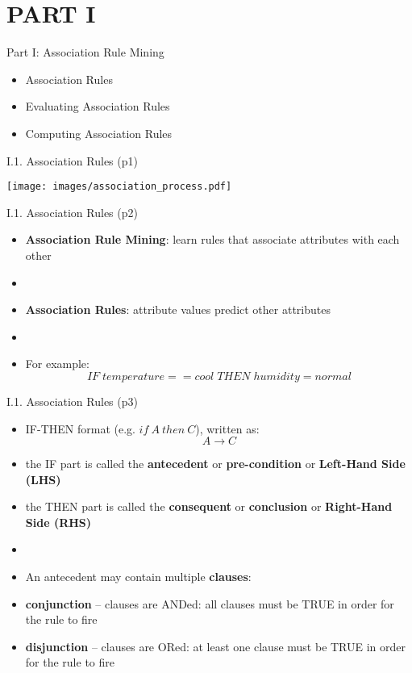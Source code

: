 \documentclass[handout]{beamer}
\newcommand{\strong}[1]{\textbf{\color{teal} #1}}
\newcommand{\stronger}[1]{\textbf{\color{purple} #1}}
\begin{document}
\section{PART I}
\begin{frame}{Part I: Association Rule Mining}
\begin{itemize}
\item[I.1.] Association Rules 
\item[I.2.] Evaluating Association Rules
\item[I.3.] Computing Association Rules
\end{itemize}
\end{frame}
\begin{frame}{I.1. Association Rules (p1)}
\begin{center}
\texttt{[image: images/association\_process.pdf]}
\end{center}
\end{frame}
\begin{frame}{I.1. Association Rules (p2)}
\begin{itemize}
\item \stronger{Association Rule Mining}: learn rules that associate attributes with each other
\item[]
\item \stronger{Association Rules}: attribute values predict other attributes
\item[]
\item For example:
\[
IF \; temperature == cool \; THEN \; humidity = normal
\]
\end{itemize}
\end{frame}
\begin{frame}{I.1. Association Rules (p3)}
\begin{itemize}
\item IF-THEN format (e.g. $if~A~then~C$), written as:
\[
	A \rightarrow C
\]
\item the IF part is called the \stronger{antecedent} or \stronger{pre-condition} or \stronger{Left-Hand Side (LHS)}
\item the THEN part is called the \stronger{consequent} or \stronger{conclusion} or \stronger{Right-Hand Side (RHS)}
\item[]
\item An antecedent may contain multiple \strong{clauses}:
\item \stronger{conjunction} -- clauses are ANDed: all clauses must be TRUE in order for the rule to fire
\item \stronger{disjunction} -- clauses are ORed: at least one clause must be TRUE in order for the rule to fire
\end{itemize}
\end{frame}
\end{document}

